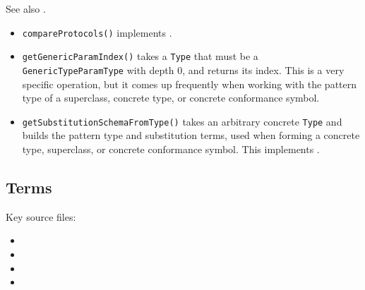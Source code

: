 \documentclass[../generics]{subfiles}
\begin{document}
See also .

\begin{itemize}
\item \texttt{compareProtocols()} implements .
\item \texttt{getGenericParamIndex()} takes a \texttt{Type} that must be a \texttt{GenericTypeParamType} with depth 0, and returns its index. This is a very specific operation, but it comes up frequently when working with the pattern type of a superclass, concrete type, or concrete conformance symbol.
\item \texttt{getSubstitutionSchemaFromType()} takes an arbitrary concrete \texttt{Type} and builds the pattern type and substitution terms, used when forming a concrete type, superclass, or concrete conformance symbol. This implements .
\end{itemize}

\subsection*{Terms}

Key source files:
\begin{itemize}
\item {}
\item {}
\item {}
\item {}
\end{itemize}
\end{document}
